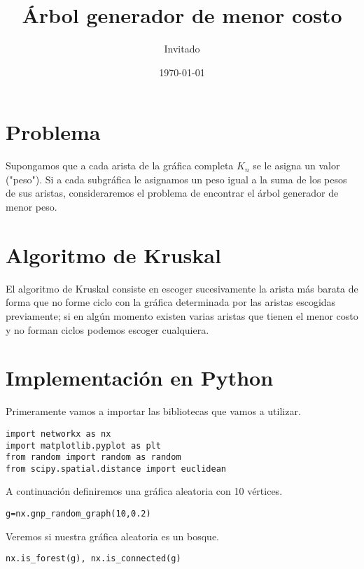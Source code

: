 \documentclass[11pt]{article}
\author{Invitado}
\date{\today}
\title{Árbol generador de menor costo}
\begin{document}
\maketitle

\section{Problema}
\label{sec:org33c88ae}

Supongamos que a cada arista de la gráfica completa \(K_{n}\) se le
asigna un valor ("peso"). Si a cada subgráfica le asignamos un peso
igual a la suma de los pesos de sus aristas, consideraremos el
problema de encontrar el árbol generador de menor peso.

\section{Algoritmo de Kruskal}
\label{sec:orga12921d}

El algoritmo de Kruskal consiste en escoger sucesivamente la arista
más barata de forma que no forme ciclo con la gráfica determinada por
las aristas escogidas previamente; si en algún momento existen varias
aristas que tienen el menor costo y no forman ciclos podemos escoger
cualquiera.

\section{Implementación en Python}
\label{sec:org7fc6dc9}

Primeramente vamos a importar las bibliotecas que vamos a utilizar.

\lstset{language=ipython,label= ,caption= ,captionpos=b,numbers=none}
\begin{lstlisting}
import networkx as nx
import matplotlib.pyplot as plt
from random import random as random
from scipy.spatial.distance import euclidean
\end{lstlisting}

A continuación definiremos una gráfica aleatoria con 10 vértices.

\lstset{language=ipython,label= ,caption= ,captionpos=b,numbers=none}
\begin{lstlisting}
g=nx.gnp_random_graph(10,0.2)
\end{lstlisting}

Veremos si nuestra gráfica aleatoria es un bosque.

\lstset{language=ipython,label= ,caption= ,captionpos=b,numbers=none}
\begin{lstlisting}
nx.is_forest(g), nx.is_connected(g)
\end{lstlisting}
\end{document}
